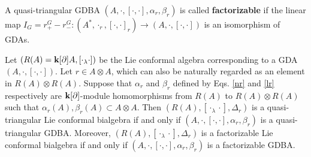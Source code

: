 \documentclass[12pt]{amsart}
\begin{document}
\begin{definition}
    A quasi-triangular GDBA $(A,\cdot,[\cdot,\cdot],\alpha_r,\beta_r)$ is called {\bf factorizable} if the linear map $I_G=r^G_+-r^G_-:(A^*, \cdot_r, [\cdot,\cdot]_r)\rightarrow (A, \cdot, [\cdot,\cdot])$ is an isomorphism of GDAs.
\end{definition}

\begin{theorem}\label{th-flgd}
    Let $(R(A)={\bf k}[\partial]A,[\cdot_\lambda\cdot])$ be the Lie conformal algebra corresponding to a GDA $(A,\cdot,[\cdot,\cdot])$.
    Let $r\in A\otimes A$, which can also be naturally regarded as an element in $ R(A)\otimes  R(A)$.
    Suppose that $\alpha_r$ and $\beta_r$ defined by Eqs. \eqref{nr} and \eqref{lr} respectively are ${\bf k}[\partial]$-module homomorphisms from $ R(A)$ to $R(A)\otimes  R(A)$ such that $ \alpha_r(A),\beta_r(A)\subset A\otimes A$. Then $( R(A),[\cdot_\lambda\cdot],\Delta_r)$ is a quasi-triangular Lie conformal bialgebra if and only if $(A,\cdot,[\cdot,\cdot],\alpha_r,\beta_r)$ is a quasi-triangular GDBA. Moreover, $( R(A),[\cdot_\lambda\cdot],\Delta_r)$ is a factorizable  Lie conformal bialgebra  if and only if $(A,\cdot,[\cdot,\cdot],\alpha_r,\beta_r)$ is a factorizable GDBA.
\end{theorem}
\end{document}
